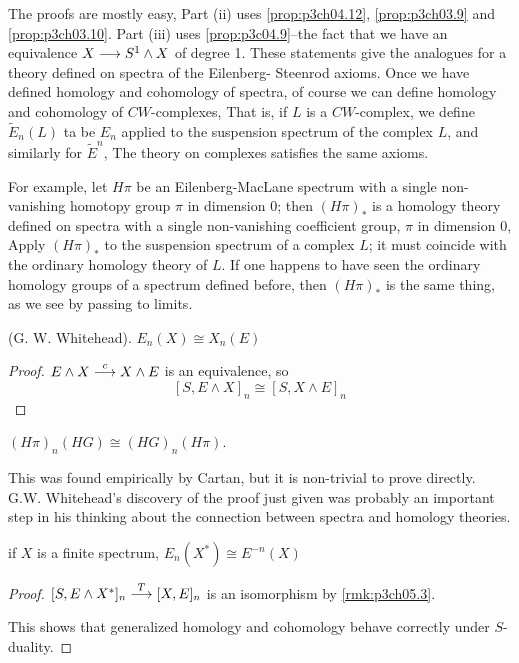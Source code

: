 \documentclass[../main]{subfiles}
\begin{document}
The proofs are mostly easy, Part (ii) uses \ref{prop:p3ch04.12}, \ref{prop:p3ch03.9} and \ref{prop:p3ch03.10}. Part (iii) uses \ref{prop:p3c04.9}--the fact that we have an equivalence $X\longrightarrow S^1 \wedge X$ of degree 1. %
These statements give the analogues for a theory defined on spectra of the Eilenberg- Steenrod axioms.
Once we have defined homology and cohomology of spectra, of course we can define homology and cohomology of $CW$-complexes, That is, if $L$ is a $CW$-complex, we define $\widetilde{E}_n(L)$ ta be $E_n$ applied to the suspension spectrum of the complex $L$, and similarly for $\widetilde{E}^n$, The theory on complexes satisfies the same axioms.

For example, let $H\pi$ be an Eilenberg-MacLane spectrum with a single non-vanishing homotopy group $\pi$ in dimension 0; then $(H\pi)_\ast$ is a homology theory  defined on spectra with a single non-vanishing coefficient group, $\pi$ in dimension 0, Apply $(H\pi)_\ast$ to the suspension spectrum of a complex $L$; it must coincide with the ordinary homology theory of $L$. If one happens to have seen the ordinary homology groups of a spectrum defined before, then $(H\pi)_\ast$ is the same thing, as we see by passing to limits.

\begin{theorem}\label{thm:p3c06.2}
(G. W. Whitehead). $E_n(X) \cong X_n(E)$
\end{theorem}

\begin{proof}
$E\wedge X \overset{c}{\longrightarrow} X \wedge E$ is an equivalence, so
\[[S, E\wedge X]_n \cong [S, X\wedge E]_n\]
\end{proof}

\begin{corollary}\label{cor:p3c06.3}
$(H\pi)_n(HG) \cong (HG)_n(H\pi)$.
\end{corollary}

This was found empirically by Cartan, but it is non-trivial to prove directly. G.W. Whitehead's discovery of the proof just given was probably an important step in his thinking about the connection between spectra and homology theories.

\begin{proposition}\label{prop:p3c06.4}
if $X$ is a finite spectrum, $E_n(X^\ast) \cong E^{-n}(X)$
\end{proposition}

\begin{proof}
$[S, E\wedge X^\ast]_n \overset{T}{\longrightarrow} [X, E]_n$ is an isomorphism by \ref{rmk:p3ch05.3}.

This shows that generalized homology and cohomology behave correctly under $S$-duality.
\end{proof}
\end{document}

